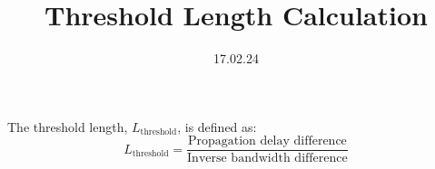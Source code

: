 \documentclass{article}
\begin{document}
\title{Threshold Length Calculation}
\author  {}
\date{17.02.24}

\maketitle

The threshold length, \( L_{\text{threshold}} \), is defined as:
\begin{equation}
L_{\text{threshold}} = \frac{\text{Propagation delay difference}}{\text{Inverse bandwidth difference}}
\end{equation}
\end{document}
